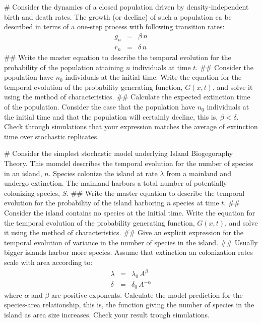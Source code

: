 \documentclass{article}
\begin{document}
\begin{easylist}[enumerate]
# Consider the dynamics of a closed population driven by density-independent birth and death rates. The growth (or decline) of such a population ca be described in terms of a one-step process with following transition rates:
\begin{eqnarray}
g_n & = & \beta\,n  \nonumber \\ 
r_n & = & \delta\,n \nonumber
\end{eqnarray}
## Write the master equation to describe the temporal evolution for the probability of the population attaining $n$ individuals at time $t$. 
## Consider the population have $n_0$ individuals at the initial time. Write the equation for the temporal evolution of the probability generating function, $G(x,t)$, and solve it using the method of characteristics. 
## Calculate the expected extinction time of the population. Consider the case that the population have $n_0$ individuals at the initial time and that the population will certainly decline, this is, $\beta < \delta$. Check through simulations that your expression matches the average of extinction time over stochastic replicates. 

# Consider the simplest stochastic model underlying Island Biogegoraphy Theory. This momdel describes the temporal evolution for the number of species in an island, $n$. Species colonize the island at rate $\lambda$ from a mainland and undergo extinction. The mainland harbors a total number of potentially colonizing species, $S$.   
## Write the master equation to describe the temporal evolution for the probability of the island harboring $n$ species at time $t$. 
## Consider the island contains no species at the initial time. Write the equation for the temporal evolution of the probability generating function, $G(x,t)$, and solve it using the method of characteristics.
## Give an explicit expression for the temporal evolution of variance in the number of species in the island.
## Usually bigger islands harbor more species. Assume that extinction an colonization rates scale with area according to:
\begin{eqnarray}
\lambda & = & \lambda_0\, A^{\beta}   \nonumber \\ 
\delta  & = & \delta_0 \, A^{-\alpha} \nonumber  
\end{eqnarray}
where $\alpha$ and $\beta$ are positive exponents. Calculate the model prediction for the species-area relationship, this is, the function giving the number of species in the island as area size increases. Check your result trough simulations.   
\end{easylist}
\end{document}

